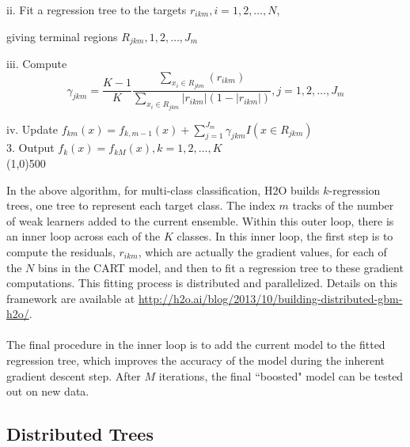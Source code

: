 \hspace{2cm} ii. Fit a regression tree to the targets $r_{ikm}, i = 1,2,\dots,N$,
\par \hspace{2.5cm} giving terminal regions $R_{jkm}, 1,2,\dots,J_m$

\hspace{2cm}iii. Compute $$\gamma_{jkm} = \frac{K-1}{K} \frac{\sum_{x_i \in R_{jkm}} (r_{ikm})}{\sum_{x_i \in R_{jkm}} |r_{ikm}| (1 - |r_{ikm}|)} , j=1,2,\dots,J_m$$

\hspace{2cm} iv. Update $f_{km}(x) = f_{k,m-1}(x) + \sum_{j=1}^{J_m} \gamma_{jkm} I(x \in R_{jkm})$
\\
3. Output $f_k^{\hat{}}(x) = f_{kM}(x),  k=1,2,\dots,K$
\\
\line(1,0){500}



In the above algorithm, for multi-class classification, H2O builds $k$-regression trees, one tree to represent each target class. The index $m$ tracks of the number of weak learners added to the current ensemble. Within this outer loop, there is an inner loop across each of the $K$ classes. In this inner loop, the first step is to compute the residuals, $r_{ikm}$, which are actually the gradient values, for each of the $N$ bins in the CART model, and then to fit a regression tree to these gradient computations. This fitting process is distributed and parallelized. Details on this framework are available at {\url{http://h2o.ai/blog/2013/10/building-distributed-gbm-h2o/}}.
\\
\\
The final procedure in the inner loop is to add the current model to the fitted regression tree, which improves the accuracy of the model during the inherent gradient descent step. After $M$ iterations, the final ``boosted" model can be tested out on new data.



\subsection{Distributed Trees}

